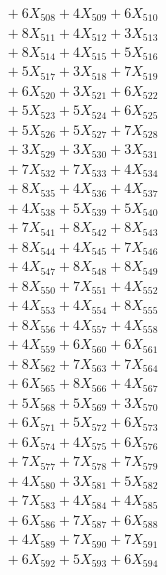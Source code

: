 \documentclass[a4paper,10pt]{article}
\begin{document}
{\begin{align}
&\;  + 6 X_{508} + 4 X_{509} + 6 X_{510} \\[0.3ex]
&\;  + 8 X_{511} + 4 X_{512} + 3 X_{513} \\[0.3ex]
&\;  + 8 X_{514} + 4 X_{515} + 5 X_{516} \\[0.3ex]
&\;  + 5 X_{517} + 3 X_{518} + 7 X_{519} \\[0.5ex]\allowbreak
&\;  + 6 X_{520} + 3 X_{521} + 6 X_{522} \\[0.3ex]
&\;  + 5 X_{523} + 5 X_{524} + 6 X_{525} \\[0.3ex]
&\;  + 5 X_{526} + 5 X_{527} + 7 X_{528} \\[0.3ex]
&\;  + 3 X_{529} + 3 X_{530} + 3 X_{531} \\[0.3ex]
&\;  + 7 X_{532} + 7 X_{533} + 4 X_{534} \\[0.3ex]
&\;  + 8 X_{535} + 4 X_{536} + 4 X_{537} \\[0.3ex]
&\;  + 4 X_{538} + 5 X_{539} + 5 X_{540} \\[0.3ex]
&\;  + 7 X_{541} + 8 X_{542} + 8 X_{543} \\[0.3ex]
&\;  + 8 X_{544} + 4 X_{545} + 7 X_{546} \\[0.3ex]
&\;  + 4 X_{547} + 8 X_{548} + 8 X_{549} \\[0.5ex]\allowbreak
&\;  + 8 X_{550} + 7 X_{551} + 4 X_{552} \\[0.3ex]
&\;  + 4 X_{553} + 4 X_{554} + 8 X_{555} \\[0.3ex]
&\;  + 8 X_{556} + 4 X_{557} + 4 X_{558} \\[0.3ex]
&\;  + 4 X_{559} + 6 X_{560} + 6 X_{561} \\[0.3ex]
&\;  + 8 X_{562} + 7 X_{563} + 7 X_{564} \\[0.3ex]
&\;  + 6 X_{565} + 8 X_{566} + 4 X_{567} \\[0.3ex]
&\;  + 5 X_{568} + 5 X_{569} + 3 X_{570} \\[0.3ex]
&\;  + 6 X_{571} + 5 X_{572} + 6 X_{573} \\[0.3ex]
&\;  + 6 X_{574} + 4 X_{575} + 6 X_{576} \\[0.3ex]
&\;  + 7 X_{577} + 7 X_{578} + 7 X_{579} \\[0.5ex]\allowbreak
&\;  + 4 X_{580} + 3 X_{581} + 5 X_{582} \\[0.3ex]
&\;  + 7 X_{583} + 4 X_{584} + 4 X_{585} \\[0.3ex]
&\;  + 6 X_{586} + 7 X_{587} + 6 X_{588} \\[0.3ex]
&\;  + 4 X_{589} + 7 X_{590} + 7 X_{591} \\[0.3ex]
&\;  + 6 X_{592} + 5 X_{593} + 6 X_{594} \\[0.3ex]

\end{align}}
\end{document}
